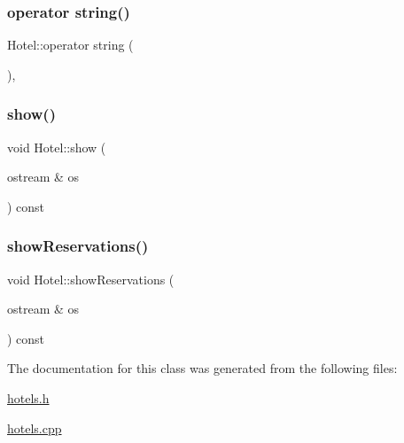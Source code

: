 \mbox{\label{class_hotel_a8528cf910b707df791daed38519c895e}} 
\subsubsection{\texorpdfstring{operator string()}{operator string()}}
{\footnotesize\ttfamily Hotel\+::operator string (\begin{DoxyParamCaption}{ }\end{DoxyParamCaption})\hspace{0.3cm}{\ttfamily [inline]}, {\ttfamily [explicit]}}

\mbox{\label{class_hotel_a78710e2a296cf886845a7fe39b9b9ddb}} 
\subsubsection{\texorpdfstring{show()}{show()}}
{\footnotesize\ttfamily void Hotel\+::show (\begin{DoxyParamCaption}\item[{ostream \&}]{os }\end{DoxyParamCaption}) const}

\mbox{\label{class_hotel_abbae1165abd672d1568cd3dcec64000e}} 
\subsubsection{\texorpdfstring{show\+Reservations()}{showReservations()}}
{\footnotesize\ttfamily void Hotel\+::show\+Reservations (\begin{DoxyParamCaption}\item[{ostream \&}]{os }\end{DoxyParamCaption}) const}



The documentation for this class was generated from the following files\+:\begin{DoxyCompactItemize}
\item 
\hyperlink{hotels_8h}{hotels.\+h}\item 
\hyperlink{hotels_8cpp}{hotels.\+cpp}\end{DoxyCompactItemize}
